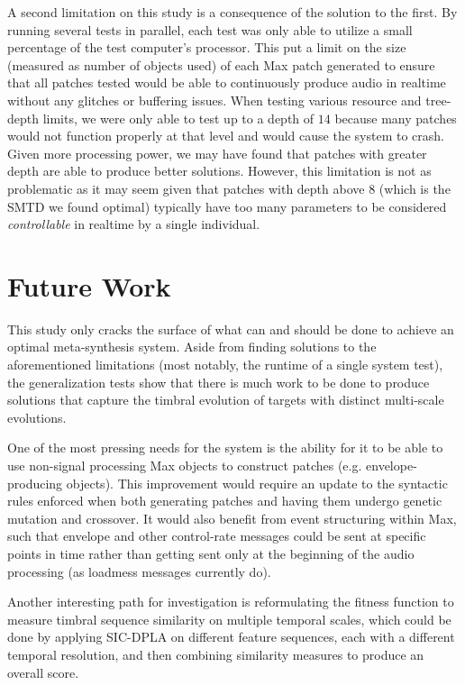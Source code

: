 \documentclass[12pt]{report} 	%
\numberwithin{figure}{chapter}
\numberwithin{table}{chapter}
\numberwithin{equation}{chapter}
\begin{document}
\begin{flushleft}
A second limitation on this study is a consequence of the solution to the first. By running several tests in parallel, each test was only able to utilize a small percentage of the test computer's processor. This put a limit on the size (measured as number of objects used) of each Max patch generated to ensure that all patches tested would be able to continuously produce audio in realtime without any glitches or buffering issues. When testing various resource and tree-depth limits, we were only able to test up to a depth of $14$ because many patches would not function properly at that level and would cause the system to crash. Given more processing power, we may have found that patches with greater depth are able to produce better solutions. However, this limitation is not as problematic as it may seem given that patches with depth above $8$ (which is the SMTD we found optimal) typically have too many parameters to be considered \textit{controllable} in realtime by a single individual.

\section{Future Work}
This study only cracks the surface of what can and should be done to achieve an optimal meta-synthesis system. Aside from finding solutions to the aforementioned limitations (most notably, the runtime of a single system test), the generalization tests show that there is much work to be done to produce solutions that capture the timbral evolution of targets with distinct multi-scale evolutions.

One of the most pressing needs for the system is the ability for it to be able to use non-signal processing Max objects to construct patches (e.g. envelope-producing objects). This improvement would require an update to the syntactic rules enforced when both generating patches and having them undergo genetic mutation and crossover. It would also benefit from event structuring within Max, such that envelope and other control-rate messages could be sent at specific points in time rather than getting sent only at the beginning of the audio processing (as loadmess messages currently do).

Another interesting path for investigation is reformulating the fitness function to measure timbral sequence similarity on multiple temporal scales, which could be done by applying SIC-DPLA on different feature sequences, each with a different temporal resolution, and then combining similarity measures to produce an overall score.


\end{flushleft}
\end{document}
